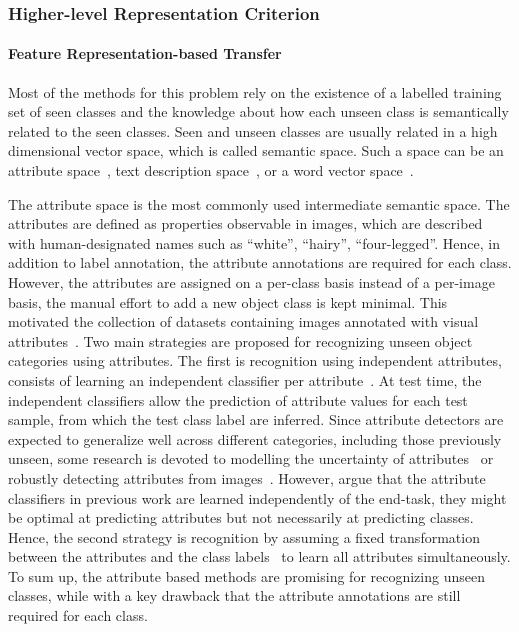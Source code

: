 \documentclass[prodmode]{acmsmall}  %
\begin{document}
\subsubsection{Higher-level Representation Criterion}
\paragraph{Feature Representation-based Transfer}
Most of the methods for this problem rely on the existence of a labelled training set of seen classes and the knowledge about how each unseen class is semantically related to the seen classes. Seen and unseen classes are usually related in a high dimensional vector space, which is called semantic space. Such a space can be an attribute space~\cite{Palatucci2009}, text description space~\cite{Reed2016}, or a word vector space~\cite{Frome2013,Mikolov2013,Socher2013}. 

The attribute space is the most commonly used intermediate semantic space. The attributes are defined as properties observable in images, which are described with human-designated names such as ``white'', ``hairy'', ``four-legged''. Hence, in addition to label annotation, the attribute annotations are required for each class. However, the attributes are assigned on a per-class basis instead of a per-image basis, the manual effort to add a new object class is kept minimal. This motivated the collection of datasets containing images annotated with visual attributes~\cite{Farhadi2009,Lampert2009}. 
Two main strategies are proposed for recognizing unseen object categories using attributes. The first is recognition using independent attributes, consists of learning an independent classifier per attribute~\cite{Lampert2009,Palatucci2009,Kumar2009,Liu2011,Parikh2011}.  At test time, the independent classifiers allow the prediction of attribute values for each test sample, from which the test class label are inferred.
Since attribute detectors are expected to generalize well across different categories, including those previously unseen, some research is devoted to modelling the uncertainty of attributes~\cite{Wang2013b,Jayaraman2014} or robustly detecting attributes from images~\cite{Gan2016,Bucher2016}. 
However,  argue that the attribute classifiers in previous work are learned independently of the end-task, they might be optimal at predicting attributes but not necessarily at predicting classes. Hence, the second strategy is recognition by assuming a fixed transformation between the attributes and the class labels~\cite{Akata2015,Romera-Paredes2015a,Akata2016,Qiao2016,Xian2016} to learn all attributes simultaneously. To sum up, the attribute based methods are promising for recognizing unseen classes, while with a key drawback that the attribute annotations are still required for each class.
\end{document}
